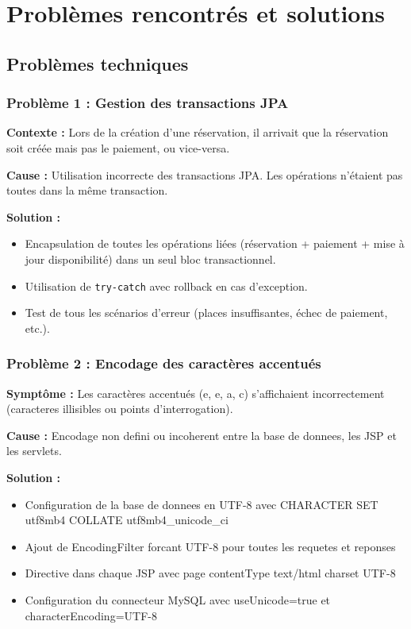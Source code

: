 \documentclass[12pt,a4paper]{report}
\begin{document}
\section{Problèmes rencontrés et solutions}

\subsection{Problèmes techniques}

\subsubsection{Problème 1 : Gestion des transactions JPA}

\textbf{Contexte :} Lors de la création d'une réservation, il arrivait que la réservation soit créée mais pas le paiement, ou vice-versa.

\textbf{Cause :} Utilisation incorrecte des transactions JPA. Les opérations n'étaient pas toutes dans la même transaction.

\textbf{Solution :}
\begin{itemize}
    \item Encapsulation de toutes les opérations liées (réservation + paiement + mise à jour disponibilité) dans un seul bloc transactionnel.
    \item Utilisation de \texttt{try-catch} avec rollback en cas d'exception.
    \item Test de tous les scénarios d'erreur (places insuffisantes, échec de paiement, etc.).
\end{itemize}

\subsubsection{Problème 2 : Encodage des caractères accentués}

\textbf{Symptôme :} Les caractères accentués (e, e, a, c) s'affichaient incorrectement (caracteres illisibles ou points d'interrogation).

\textbf{Cause :} Encodage non defini ou incoherent entre la base de donnees, les JSP et les servlets.

\textbf{Solution :}
\begin{itemize}
    \item Configuration de la base de donnees en UTF-8 avec CHARACTER SET utf8mb4 COLLATE utf8mb4\_unicode\_ci
    \item Ajout de EncodingFilter forcant UTF-8 pour toutes les requetes et reponses
    \item Directive dans chaque JSP avec page contentType text/html charset UTF-8
    \item Configuration du connecteur MySQL avec useUnicode=true et characterEncoding=UTF-8
\end{itemize}
\end{document}
